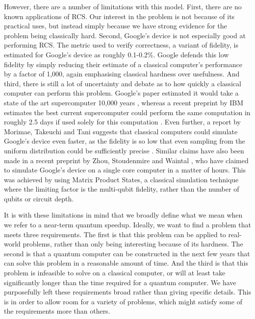 However, there are a number of limitations with this model. First, there are no known applications of RCS. Our interest in the problem is not because of its practical uses, but instead simply because we have strong evidence for the problem being classically hard. Second, Google's device is not especially good at performing RCS. The metric used to verify correctness, a variant of fidelity, is estimated for Google's device as roughly 0.1-0.2\%. Google defends this low fidelity by simply reducing their estimate of a classical computer's performance by a factor of 1,000, again emphasising classical hardness over usefulness. And third, there is still a lot of uncertainty and debate as to how quickly a classical computer can perform this problem. Google's paper estimated it would take a state of the art supercomputer 10,000 years \cite{arute2019}, whereas a recent preprint by IBM estimates the best current supercomputer could perform the same computation in roughly 2.5 days if used solely for this computation \cite{pednault2019}. Even further, a report by Morimae, Takeuchi and Tani suggests that classical computers could simulate Google's device even faster, as the fidelity is so low that even sampling from the uniform distribution could be sufficiently precise \cite{morimae2019google}. Similar claims have also been made in a recent preprint by Zhou, Stoudenmire and Waintal \cite{zhou2020}, who have claimed to simulate Google's device on a single core computer in a matter of hours. This was achieved by using Matrix Product States, a classical simulation technique where the limiting factor is the multi-qubit fidelity, rather than the number of qubits or circuit depth.

It is with these limitations in mind that we broadly define what we mean when we refer to a near-term quantum speedup. Ideally, we want to find a problem that meets three requirements. The first is that this problem can be applied to real-world problems, rather than only being interesting because of its hardness. The second is that a quantum computer can be constructed in the next few years that can solve this problem in a reasonable amount of time. And the third is that this problem is infeasible to solve on a classical computer, or will at least take significantly longer than the time required for a quantum computer. We have purposefully left these requirements broad rather than giving specific details. This is in order to allow room for a variety of problems, which might satisfy some of the requirements more than others.

